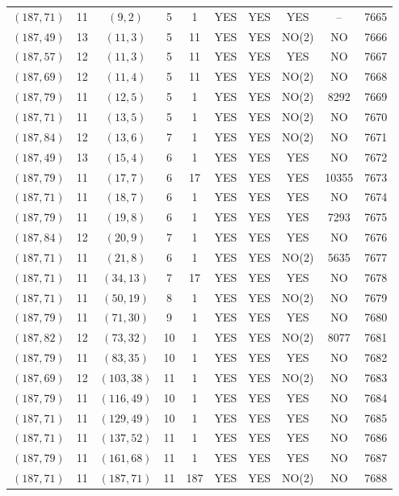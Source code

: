 \begin{longtable}{|c|c|c|c|c|c|c|c|c|c|}
$(187, 71)$ & 11 & $(9, 2)$ & 5 & 1 & YES & YES & YES & -- & 7665\\
$(187, 49)$ & 13 & $(11, 3)$ & 5 & 11 & YES & YES & NO(2) & NO & 7666\\
$(187, 57)$ & 12 & $(11, 3)$ & 5 & 11 & YES & YES & YES & NO & 7667\\
$(187, 69)$ & 12 & $(11, 4)$ & 5 & 11 & YES & YES & NO(2) & NO & 7668\\
$(187, 79)$ & 11 & $(12, 5)$ & 5 & 1 & YES & YES & NO(2) & 8292 & 7669\\
$(187, 71)$ & 11 & $(13, 5)$ & 5 & 1 & YES & YES & NO(2) & NO & 7670\\
$(187, 84)$ & 12 & $(13, 6)$ & 7 & 1 & YES & YES & NO(2) & NO & 7671\\
$(187, 49)$ & 13 & $(15, 4)$ & 6 & 1 & YES & YES & YES & NO & 7672\\
$(187, 79)$ & 11 & $(17, 7)$ & 6 & 17 & YES & YES & YES & 10355 & 7673\\
$(187, 71)$ & 11 & $(18, 7)$ & 6 & 1 & YES & YES & YES & NO & 7674\\
$(187, 79)$ & 11 & $(19, 8)$ & 6 & 1 & YES & YES & YES & 7293 & 7675\\
$(187, 84)$ & 12 & $(20, 9)$ & 7 & 1 & YES & YES & YES & NO & 7676\\
$(187, 71)$ & 11 & $(21, 8)$ & 6 & 1 & YES & YES & NO(2) & 5635 & 7677\\
$(187, 71)$ & 11 & $(34, 13)$ & 7 & 17 & YES & YES & YES & NO & 7678\\
$(187, 71)$ & 11 & $(50, 19)$ & 8 & 1 & YES & YES & NO(2) & NO & 7679\\
$(187, 79)$ & 11 & $(71, 30)$ & 9 & 1 & YES & YES & YES & NO & 7680\\
$(187, 82)$ & 12 & $(73, 32)$ & 10 & 1 & YES & YES & NO(2) & 8077 & 7681\\
$(187, 79)$ & 11 & $(83, 35)$ & 10 & 1 & YES & YES & YES & NO & 7682\\
$(187, 69)$ & 12 & $(103, 38)$ & 11 & 1 & YES & YES & NO(2) & NO & 7683\\
$(187, 79)$ & 11 & $(116, 49)$ & 10 & 1 & YES & YES & YES & NO & 7684\\
$(187, 71)$ & 11 & $(129, 49)$ & 10 & 1 & YES & YES & YES & NO & 7685\\
$(187, 71)$ & 11 & $(137, 52)$ & 11 & 1 & YES & YES & YES & NO & 7686\\
$(187, 79)$ & 11 & $(161, 68)$ & 11 & 1 & YES & YES & YES & NO & 7687\\
$(187, 71)$ & 11 & $(187, 71)$ & 11 & 187 & YES & YES & NO(2) & NO & 7688\\

\end{longtable}
